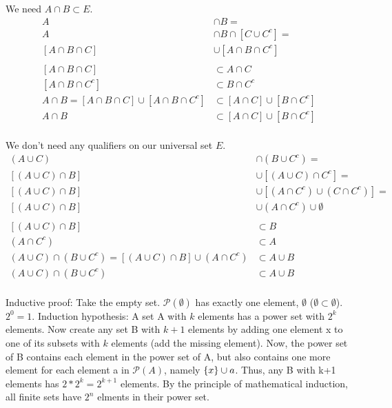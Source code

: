 \documentclass{article}
\DeclarePairedDelimiter\crl{\{}{\}}
\newcommand{\nl}[0]{\newline}
\begin{document}
\begin{flushleft}
 \nl
We need $A \cap B \subset E$.
$$ \begin{aligned}
A &\cap B =\\
A &\cap B \cap [C \cup C^c] =\\
[A \cap B \cap C] &\cup [A \cap B \cap C^c] \\ \\
[A \cap B \cap C] &\subset A \cap C\\
[A \cap B \cap C^c] &\subset B \cap C^c\\
A \cap B = [A \cap B \cap C] \cup [A \cap B \cap C^c] &\subset [A \cap C] \cup [B \cap C^c]\\
A \cap B &\subset [A \cap C] \cup [B \cap C^c]\\
\end{aligned}$$

 \nl
We don't need any qualifiers on our universal set $E$.
$$\begin{aligned}
(A \cup C) &\cap (B \cup C^c) =\\
[(A \cup C) \cap B] &\cup [(A \cup C) \cap C^c] =\\
[(A \cup C) \cap B] &\cup [(A \cap C^c) \cup (C \cap C^c)] =\\
[(A \cup C) \cap B] &\cup (A \cap C^c) \cup \emptyset\\ \\
[(A \cup C) \cap B] &\subset B\\
(A \cap C^c) &\subset A\\
(A \cup C) \cap (B \cup C^c) = [(A \cup C) \cap B] \cup (A \cap C^c) &\subset A \cup B \\
(A \cup C) \cap (B \cup C^c) &\subset A \cup B\\
\end{aligned}$$

 \nl
Inductive proof: Take the empty set. $\mathscr{P}(\emptyset)$ has exactly one element, $\emptyset$ ($\emptyset \subset \emptyset$). $2^0 = 1$. \nl
Induction hypothesis: A set A with $k$ elements has a power set with $2^k$ elements. \nl
Now create any set B with $k+1$ elements by adding one element x to one of its subsets with $k$ elements (add the missing element). Now, the power set of B contains each element in the power set of A, but also contains one more element for each element a in $\mathscr{P}(A)$, namely $\crl{x} \cup a$. Thus, any B with k+1 elements has $2*2^k = 2^{k+1}$ elements. By the principle of mathematical induction, all finite sets have $2^n$ elments in their power set. \nl


\end{flushleft}
\end{document}
